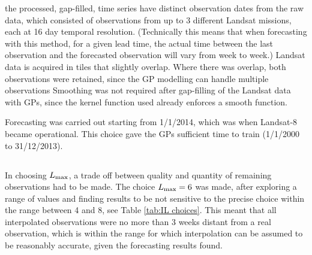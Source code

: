 \documentclass[review]{elsarticle}
\begin{document}
 the processed, gap-filled, time series have distinct observation dates from the raw data, which consisted of observations from up to 3 different Landsat missions, each at 16 day temporal resolution. (Technically this means that when forecasting with this method, for a given lead time, the actual time between the last observation and the forecasted observation will vary from week to week.)  Landsat data is acquired in tiles that slightly overlap. Where there was overlap, both observations were retained, since the GP modelling can handle multiple observations  Smoothing was not required after gap-filling of the Landsat data with GPs, since the kernel function used already enforces a smooth function.

 Forecasting was carried out starting from 1/1/2014, which was when Landsat-8 became operational. This choice gave the GPs sufficient time to train (1/1/2000 to 31/12/2013).



\subsection{} \label{sec:Lmax}
 In choosing $L_{\rm{max}}$, a trade off between quality and quantity of remaining observations had to be made. The choice $L_{\rm{max}}=6$ was made, after exploring a range of values and finding results to be not sensitive to the precise choice within the range between 4 and 8, see Table \ref{tab:IL choices}. This meant that all interpolated observations were no more than 3 weeks distant from a real observation, which is within the range for which interpolation can be assumed to be reasonably accurate, given the forecasting results found. 
\end{document}
